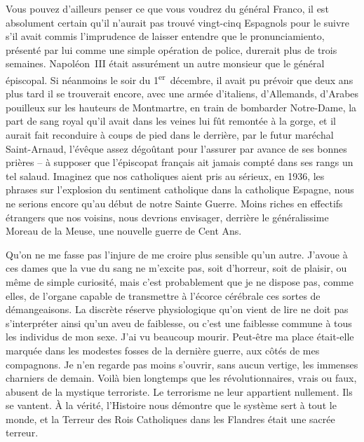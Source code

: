 \documentclass[french,twoside]{book} %
\newcommand{\astertri}{\medskip\par\centerline{\color{rubric}\large\selectfont{\syms ✻\,✻\,✻}}\medskip\par}%
\begin{document}
\noindent Vous pouvez d’ailleurs penser ce que vous voudrez du général Franco, il est absolument certain qu’il n’aurait pas trouvé vingt-cinq Espagnols pour le suivre s’il avait commis l’imprudence de laisser entendre que le pronunciamiento, présenté par lui comme une simple opération de police, durerait plus de trois semaines. Napoléon \textsc{III} était assurément un autre monsieur que le général épiscopal. Si néanmoins le soir du 1\textsuperscript{er} décembre, il avait pu prévoir que deux ans plus tard il se trouverait encore, avec une armée d’italiens, d’Allemands, d’Arabes pouilleux sur les hauteurs de Montmartre, en train de bombarder Notre-Dame, la part de sang royal qu’il avait dans les veines lui fût remontée à la gorge, et il aurait fait reconduire à coups de pied dans le derrière, par le futur maréchal Saint-Arnaud, l’évêque assez dégoûtant pour l’assurer par avance de ses bonnes prières – à supposer que l’épiscopat français ait jamais compté dans ses rangs un tel salaud. Imaginez que nos catholiques aient pris au sérieux, en 1936, les phrases sur l’explosion du sentiment catholique dans la catholique Espagne, nous ne serions encore qu’au début de notre Sainte Guerre. Moins riches en effectifs étrangers que nos voisins, nous devrions envisager, derrière le généralissime Moreau de la Meuse, une nouvelle guerre de Cent Ans.\par

\astertri

\noindent Qu’on ne me fasse pas l’injure de me croire plus sensible qu’un autre. J’avoue à ces dames que la vue du sang ne m’excite pas, soit d’horreur, soit de plaisir, ou même de simple curiosité, mais c’est probablement que je ne dispose pas, comme elles, de l’organe capable de transmettre à l’écorce cérébrale ces sortes de démangeaisons. La discrète réserve physiologique qu’on vient de lire ne doit pas s’interpréter ainsi qu’un aveu de faiblesse, ou c’est une faiblesse commune à tous les individus de mon sexe. J’ai vu beaucoup mourir. Peut-être ma place était-elle marquée dans les modestes fosses de la dernière guerre, aux côtés de mes compagnons. Je n’en regarde pas moins s’ouvrir, sans aucun vertige, les immenses charniers de demain. Voilà bien longtemps que les révolutionnaires, vrais ou faux, abusent de la mystique terroriste. Le terrorisme ne leur appartient nullement. Ils se vantent. À la vérité, l’Histoire nous démontre que le système sert à tout le monde, et la Terreur des Rois Catholiques dans les Flandres était une sacrée terreur.\par
\end{document}
